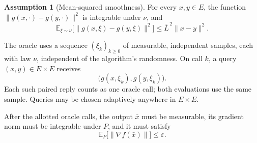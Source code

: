 \documentclass[10pt]{article}
\theoremstyle{definition}
\newtheorem{assumption}{Assumption}
\begin{document}
\begin{assumption}[Mean-squared smoothness]
For every $x,y\in E$, the function $\|g(x,\cdot)-g(y,\cdot)\|^2$ is integrable under $\nu$, and
\[
\mathbb{E}_{\xi\sim\nu}\bigl[\|g(x,\xi)-g(y,\xi)\|^2\bigr]
\leq \overline{L}^{\,2}\|x-y\|^2.
\]
\end{assumption}

The oracle uses a sequence $(\xi_k)_{k\geq0}$ of measurable, independent samples, each with law $\nu$, independent of the algorithm's randomness. On call $k$, a query $(x,y)\in E\times E$ receives
\[
\bigl(g(x,\xi_k),g(y,\xi_k)\bigr).
\]
Each such paired reply counts as one oracle call; both evaluations use the same sample. Queries may be chosen adaptively anywhere in $E\times E$.

After the allotted oracle calls, the output $\bar{x}$ must be measurable, its gradient norm must be integrable under $P$, and it must satisfy
\[
\mathbb{E}_{P}\bigl[\|\nabla f(\bar{x})\|\bigr]\leq\varepsilon.
\]
\end{document}
